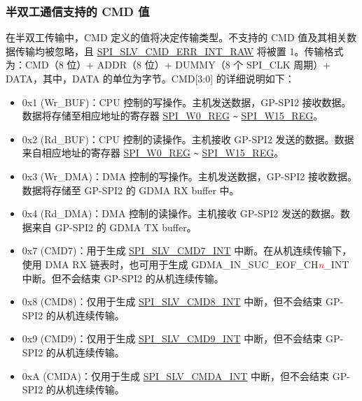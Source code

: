 \documentclass[main\_\_CN.tex]{subfiles}
\begin{document}
\subsubsection{半双工通信支持的 CMD 值} \label{para:spi-cmd-values-half-duplex-comm}

在半双工传输中，CMD 定义的值将决定传输类型。不支持的 CMD 值及其相关数据传输均被忽略，且 \hyperref[fielddesc:SPISLVCMDERRINTRAW]{SPI\_SLV\_CMD\_ERR\_INT\_RAW} 将被置 1。传输格式为：CMD（8 位）+ ADDR（8 位）+ DUMMY（8 个 SPI\_CLK 周期）+ DATA，其中，DATA 的单位为字节。CMD[3:0] 的详细说明如下：


\begin{itemize}
    \item \label{cmd:wrbuf} 0x1 (Wr\_BUF)：CPU 控制的写操作。主机发送数据，GP-SPI2 接收数据。数据将存储至相应地址的寄存器 \hyperref[regdesc:SPIW0REG]{SPI\_W0\_REG} \verb+~+ \hyperref[regdesc:SPIW0REG]{SPI\_W15\_REG}。

    \item \label{cmd:rdbuf} 0x2 (Rd\_BUF)：CPU 控制的读操作。主机接收 GP-SPI2 发送的数据。数据来自相应地址的寄存器 \hyperref[regdesc:SPIW0REG]{SPI\_W0\_REG} \verb+~+ \hyperref[regdesc:SPIW0REG]{SPI\_W15\_REG}。

    \item \label{cmd:wrdma} 0x3 (Wr\_DMA)：DMA 控制的写操作。主机发送数据，GP-SPI2 接收数据。数据将存储至 GP-SPI2 的 GDMA RX buffer 中。

    \item \label{cmd:rddma} 0x4 (Rd\_DMA)：DMA 控制的读操作。主机接收 GP-SPI2 发送的数据。数据来自 GP-SPI2 的 GDMA TX buffer。

    \item \label{cmd:CMD7} 0x7 (CMD7)：用于生成 \hyperref[int:SPISLVCMD7INT]{SPI\_SLV\_CMD7\_INT} 中断。在从机连续传输下，使用 DMA RX 链表时，也可用于生成 GDMA\_IN\_SUC\_EOF\_CH\textcolor{red}{\it{n}}\_INT  中断。但不会结束 GP-SPI2 的从机连续传输。

    \item 0x8 (CMD8)：仅用于生成 \hyperref[int:SPISLVCMD8INT]{SPI\_SLV\_CMD8\_INT} 中断，但不会结束 GP-SPI2 的从机连续传输。

    \item 0x9 (CMD9)：仅用于生成 \hyperref[int:SPISLVCMD9INT]{SPI\_SLV\_CMD9\_INT} 中断，但不会结束 GP-SPI2 的从机连续传输。

    \item 0xA (CMDA)：仅用于生成 \hyperref[int:SPISLVCMDAINT]{SPI\_SLV\_CMDA\_INT} 中断，但不会结束 GP-SPI2 的从机连续传输。

\end{itemize}
\end{document}
